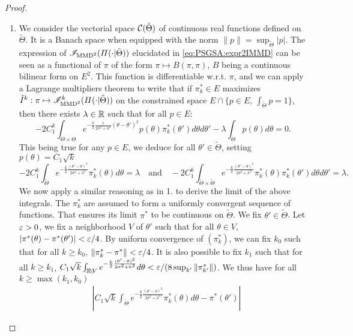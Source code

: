 \begin{proof}
\begin{enumerate}
\item We consider the vectorial space $\mathcal{C}(\tilde\Theta)$ of continuous real functions defined on $\tilde\Theta$. It is a Banach space when equipped with the norm $\|p\|=\sup_{\tilde\Theta}|p|$. The expression of $\mathscr{I}_{\text{MMD}^2}(\varPi(\cdot|\tilde\Theta))$ elucidated in \cref{eq:PSGSA:expr2IMMD} can be seen as a functional of $\pi$ of the form $\pi\mapsto B(\pi,\pi)$, $B$ being a continuous bilinear form on $E^2$. This function is differentiable w.r.t. $\pi$, and we can apply a Lagrange multipliers theorem to write that if $\pi_k^\ast\in E$ maximizes $\tilde I^k:\pi\mapsto\mathscr{I}^k_{\text{MMD}^2}(\varPi(\cdot|\tilde\Theta))$ on the constrained space $E\cap\{p\in E,\,\int_{\tilde\Theta}p=1\}$, then there exists $\lambda\in\mathbb{R}$ such that for all $p\in E$:
\begin{equation}
    -2C_1^k\int_{\Theta\times\Theta} e^{-\frac{k}{2}\frac{1}{2\sigma^2+h^2}(\theta-\theta')^2} p(\theta)\pi^\ast_k(\theta')d\theta d\theta' - \lambda\int_\Theta p(\theta)d\theta = 0.
\end{equation}
This being true for any $p\in E$, we deduce for all $\theta'\in\tilde\Theta$, setting $p(\theta) = C_1\sqrt{k} $
    \begin{equation}
        -2C_1^k\int_{\tilde\Theta} e^{-\frac{k}{2}\frac{(\theta'-\theta)^2}{2\sigma^2+h^2}} \pi_k^\ast(\theta)d\theta = \lambda \quad\text{and}\quad
        -2C_1^k\int_{\tilde\Theta\times\tilde\Theta} e^{-\frac{k}{2}\frac{(\theta'-\theta)^2}{2\sigma^2+h^2}} \pi_k^\ast(\theta)\pi_k^\ast(\theta')d\theta d\theta' = \lambda.
    \end{equation}
We now apply a similar reasoning as in 1. to derive the limit of the above integrals. 
The $\pi^\ast_k$ are assumed to form a uniformly convergent sequence of functions. That ensures its limit $\pi^\ast$ to be continuous on $\tilde\Theta$.
We fix $\theta'\in\tilde\Theta$. Let $\varepsilon>0$, we fix a neighborhood $V$ of $\theta'$ such that for all $\theta \in V$, $|\pi^\ast(\theta)-\pi^\ast(\theta')|<\varepsilon/4$. By uniform convergence of $(\pi^\ast_k)$, we can fix $k_0$ such that for all $k\geq k_0$, $\|\pi^\ast_k-\pi^\ast\|<\varepsilon/4$. It is also possible to fix $k_1$ such that for all $k\geq k_1$, $C_1\sqrt{k}\int_{\mathbb{R}\!\setminus\!V} e^{-\frac{k}{2}\frac{(\theta'-\theta)^2}{2\sigma^2+h^2}}d\theta <\varepsilon/(8\sup_{k'}\|\pi^\ast_{k'}\|)$.
    We thus have for all $k\geq\max(k_1,k_0)$
    \begin{equation}
        \begin{aligned}
        &\left|C_1\sqrt{k}\int_{\tilde\Theta } e^{-\frac{k}{2}\frac{(\theta'-\theta)^2}{2\sigma^2+h^2}} \pi^\ast_k(\theta)d\theta - \pi^\ast(\theta') \right| 

\end{aligned}
\end{equation}
\end{enumerate}
\end{proof}
